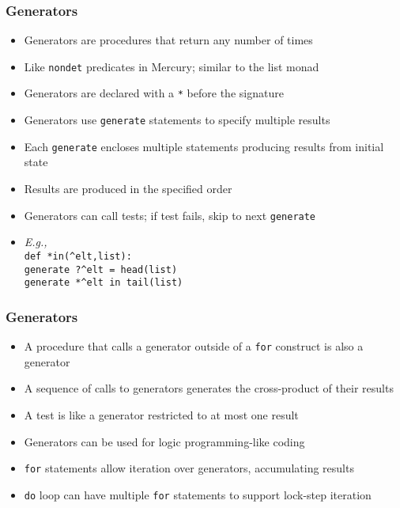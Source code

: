 \documentclass[12pt]{beamer}
\begin{document}
\begin{frame}
\frametitle{Generators}
\begin{itemize}
\item Generators are procedures that return any number of times
\item Like \texttt{nondet} predicates in Mercury; similar to the list monad
\item Generators are declared with a \texttt{*} before the signature
\item Generators use \texttt{generate} statements to specify
  multiple results
\item Each \texttt{generate} encloses multiple statements producing
  results from initial state
\item Results are produced in the specified order
\item Generators can call tests; if test fails, skip to next \texttt{generate}
\item \emph{E.g.,} \\
  \hspace*{2em}\texttt{def *in(\^{ }elt,list):} \\
  \hspace*{4em}\texttt{generate ?\^{ }elt = head(list)} \\
  \hspace*{4em}\texttt{generate *\^{ }elt in tail(list)} \\

\end{itemize}
\end{frame}


\begin{frame}
\frametitle{Generators}
\begin{itemize}
\item A procedure that calls a generator outside of a \texttt{for}
  construct is also a generator
\item A sequence of calls to generators generates the cross-product of
  their results
\item A test is like a generator restricted to at most one result
\item Generators can be used for logic programming-like coding
\item \texttt{for} statements allow iteration over generators,
  accumulating results
\item \texttt{do} loop can have multiple \texttt{for} statements to
  support lock-step iteration
\end{itemize}
\end{frame}
\end{document}
